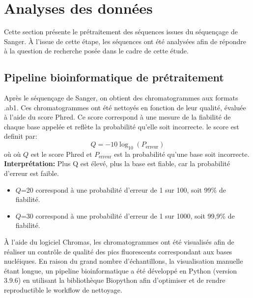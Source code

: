 \documentclass[a4paper,12pt]{article}
\begin{document}
\newpage 

\section{Analyses des données}
Cette section présente le prétraitement des séquences issues du séquençage de Sanger. À l’issue de cette étape, les séquences ont été analysées afin de répondre à la question de recherche posée dans le cadre de cette étude.

\subsection{Pipeline bioinformatique de prétraitement }

Après le séquençage de Sanger, on obtient des chromatogrammes aux formats .ab1. Ces chromatogrammes  ont été nettoyés en fonction de leur qualité, évaluée à l’aide du score Phred. Ce score correspond à une mesure de la fiabilité de chaque base appelée et reflète la probabilité qu’elle soit incorrecte. le score est definit par:
\[
Q = -10 \log_{10}\left(P_{\mathrm{erreur}}\right)
\]
où où $Q$ est le score Phred et $P_{\mathrm{erreur}}$ est la probabilité qu'une base soit incorrecte. \\
\textbf{Interprétation: }
Plus Q est élevé, plus la base est fiable, car la probabilité d’erreur est faible.\\
\begin {itemize}
\item $Q$=20 correspond à une probabilité d’erreur de 1 sur 100, soit 99\% de fiabilité.
\item  $Q$=30 correspond à une probabilité d’erreur de 1 sur 1000, soit 99,9\% de fiabilité. \\
\end {itemize}
À l’aide du logiciel Chromas, les chromatogrammes ont été visualisés afin de réaliser un contrôle de qualité des pics fluorescents correspondant aux bases nucléiques. En raison du grand nombre d’échantillons, la visualisation manuelle étant longue, un pipeline bioinformatique a été développé en Python (version 3.9.6) en utilisant la bibliothèque Biopython afin d’optimiser et de rendre reproductible le workflow de nettoyage. 
\end{document}
